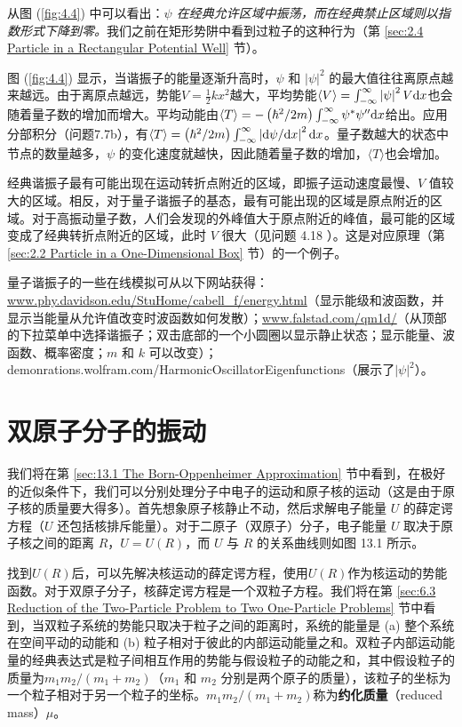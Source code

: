     从图 (\ref{fig:4.4}) 中可以看出：\textit{$\psi$ 在经典允许区域中振荡，而在经典禁止区域则以指数形式下降到零。}我们之前在矩形势阱中看到过粒子的这种行为（第 \ref{sec:2.4 Particle in a Rectangular Potential Well} 节）。

    图 (\ref{fig:4.4}) 显示，当谐振子的能量逐渐升高时，$\psi$ 和 $\left|\psi\right|^2$ 的最大值往往离原点越来越远。由于离原点越远，势能$V = \frac{1}{2}kx^2$越大，平均势能$\langle V \rangle = \int_{-\infty}^{\infty} \left|\psi\right|^2V\dd x$也会随着量子数的增加而增大。平均动能由$\langle T \rangle = -\left(\hbar^2/2m\right)\int_{-\infty}^{\infty} \psi^{\ast}\psi^{\prime\prime}\dd x$给出。应用分部积分（问题7.7b），有$\langle T \rangle = \left(\hbar^2/2m\right)\int_{-\infty}^{\infty} \left|\dd \psi/\dd x\right|^2\dd x$。量子数越大的状态中节点的数量越多，$\psi$ 的变化速度就越快，因此随着量子数的增加，$\langle T \rangle$也会增加。

    经典谐振子最有可能出现在运动转折点附近的区域，即振子运动速度最慢、$V$ 值较大的区域。相反，对于量子谐振子的基态，最有可能出现的区域是原点附近的区域。对于高振动量子数，人们会发现的外峰值大于原点附近的峰值，最可能的区域变成了经典转折点附近的区域，此时 $V$ 很大（见问题 4.18 ）。这是对应原理（第 \ref{sec:2.2 Particle in a One-Dimensional Box} 节）的一个例子。

    量子谐振子的一些在线模拟可从以下网站获得：\url{www.phy.davidson.edu/StuHome/cabell_f/energy.html}（显示能级和波函数，并显示当能量从允许值改变时波函数如何发散）；\url{www.falstad.com/qm1d/}（从顶部的下拉菜单中选择谐振子；双击底部的一个小圆圈以显示静止状态；显示能量、波函数、概率密度；$m$ 和 $k$ 可以改变）；demonrations.wolfram.com/HarmonicOscillatorEigenfunctions（展示了$\left|\psi\right|^2$）。

\section{双原子分子的振动}
\label{sec:4.3 Vibrations of Diatomic Molecules}
    我们将在第 \ref{sec:13.1 The Born-Oppenheimer Approximation} 节中看到，在极好的近似条件下，我们可以分别处理分子中电子的运动和原子核的运动（这是由于原子核的质量要大得多）。首先想象原子核静止不动，然后求解电子能量 $U$ 的薛定谔方程（$U$ 还包括核排斥能量）。对于二原子（双原子）分子，电子能量 $U$ 取决于原子核之间的距离 $R$，$U=U\left(R\right)$，而 $U$ 与 $R$ 的关系曲线则如图 13.1 所示。

    找到$U\left(R\right)$后，可以先解决核运动的薛定谔方程，使用$U\left(R\right)$作为核运动的势能函数。对于双原子分子，核薛定谔方程是一个双粒子方程。我们将在第 \ref{sec:6.3 Reduction of the Two-Particle Problem to Two One-Particle Problems} 节中看到，当双粒子系统的势能只取决于粒子之间的距离时，系统的能量是 (a) 整个系统在空间平动的动能和 (b) 粒子相对于彼此的内部运动能量之和。双粒子内部运动能量的经典表达式是粒子间相互作用的势能与假设粒子的动能之和，其中假设粒子的质量为$m_1m_2/\left(m_1+m_2\right)$（$m_1$ 和 $m_2$ 分别是两个原子的质量），该粒子的坐标为一个粒子相对于另一个粒子的坐标。$m_1m_2/\left(m_1+m_2\right)$称为\textbf{约化质量}（reduced mass）$\mu$。

